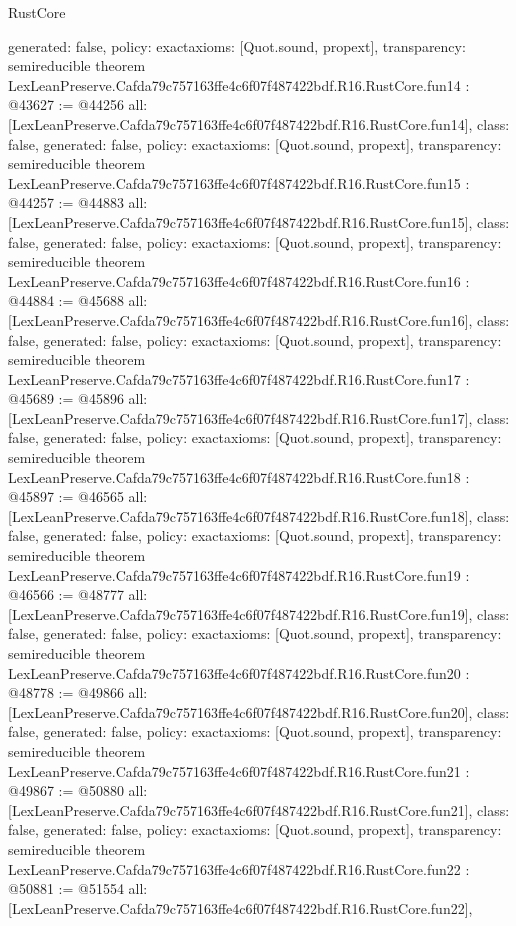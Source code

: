 \begin{lexlean}{RustCore}
\begin{coremodule}
{  generated: false,
  policy: exact{axioms: [Quot.sound, propext]},
  transparency: semireducible
}
theorem LexLeanPreserve.Cafda79c757163ffe4c6f07f487422bdf.R16.RustCore.fun14 : @43627 := @44256 {
  all: [LexLeanPreserve.Cafda79c757163ffe4c6f07f487422bdf.R16.RustCore.fun14],
  class: false,
  generated: false,
  policy: exact{axioms: [Quot.sound, propext]},
  transparency: semireducible
}
theorem LexLeanPreserve.Cafda79c757163ffe4c6f07f487422bdf.R16.RustCore.fun15 : @44257 := @44883 {
  all: [LexLeanPreserve.Cafda79c757163ffe4c6f07f487422bdf.R16.RustCore.fun15],
  class: false,
  generated: false,
  policy: exact{axioms: [Quot.sound, propext]},
  transparency: semireducible
}
theorem LexLeanPreserve.Cafda79c757163ffe4c6f07f487422bdf.R16.RustCore.fun16 : @44884 := @45688 {
  all: [LexLeanPreserve.Cafda79c757163ffe4c6f07f487422bdf.R16.RustCore.fun16],
  class: false,
  generated: false,
  policy: exact{axioms: [Quot.sound, propext]},
  transparency: semireducible
}
theorem LexLeanPreserve.Cafda79c757163ffe4c6f07f487422bdf.R16.RustCore.fun17 : @45689 := @45896 {
  all: [LexLeanPreserve.Cafda79c757163ffe4c6f07f487422bdf.R16.RustCore.fun17],
  class: false,
  generated: false,
  policy: exact{axioms: [Quot.sound, propext]},
  transparency: semireducible
}
theorem LexLeanPreserve.Cafda79c757163ffe4c6f07f487422bdf.R16.RustCore.fun18 : @45897 := @46565 {
  all: [LexLeanPreserve.Cafda79c757163ffe4c6f07f487422bdf.R16.RustCore.fun18],
  class: false,
  generated: false,
  policy: exact{axioms: [Quot.sound, propext]},
  transparency: semireducible
}
theorem LexLeanPreserve.Cafda79c757163ffe4c6f07f487422bdf.R16.RustCore.fun19 : @46566 := @48777 {
  all: [LexLeanPreserve.Cafda79c757163ffe4c6f07f487422bdf.R16.RustCore.fun19],
  class: false,
  generated: false,
  policy: exact{axioms: [Quot.sound, propext]},
  transparency: semireducible
}
theorem LexLeanPreserve.Cafda79c757163ffe4c6f07f487422bdf.R16.RustCore.fun20 : @48778 := @49866 {
  all: [LexLeanPreserve.Cafda79c757163ffe4c6f07f487422bdf.R16.RustCore.fun20],
  class: false,
  generated: false,
  policy: exact{axioms: [Quot.sound, propext]},
  transparency: semireducible
}
theorem LexLeanPreserve.Cafda79c757163ffe4c6f07f487422bdf.R16.RustCore.fun21 : @49867 := @50880 {
  all: [LexLeanPreserve.Cafda79c757163ffe4c6f07f487422bdf.R16.RustCore.fun21],
  class: false,
  generated: false,
  policy: exact{axioms: [Quot.sound, propext]},
  transparency: semireducible
}
theorem LexLeanPreserve.Cafda79c757163ffe4c6f07f487422bdf.R16.RustCore.fun22 : @50881 := @51554 {
  all: [LexLeanPreserve.Cafda79c757163ffe4c6f07f487422bdf.R16.RustCore.fun22],
}
\end{coremodule}
\end{lexlean}

